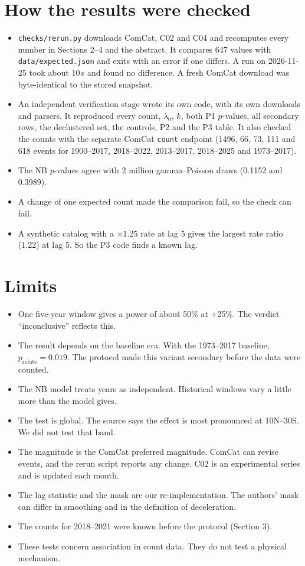 \documentclass[11pt]{article}
\begin{document}
\section{How the results were checked}
\begin{itemize}
\item \texttt{checks/rerun.py} downloads ComCat, C02 and C04 and recomputes every number in Sections 2--4 and the abstract. It compares 647 values with \texttt{data/expected.json} and exits with an error if one differs. A run on 2026-11-25 took about 10\,s and found no difference. A fresh ComCat download was byte-identical to the stored snapshot.
\item An independent verification stage wrote its own code, with its own downloads and parsers. It reproduced every count, $\lambda_0$, $k$, both P1 $p$-values, all secondary rows, the declustered set, the controls, P2 and the P3 table. It also checked the counts with the separate ComCat \texttt{count} endpoint (1496, 66, 73, 111 and 618 events for 1900--2017, 2018--2022, 2013--2017, 2018--2025 and 1973--2017).
\item The NB $p$-values agree with 2 million gamma--Poisson draws (0.1152 and 0.3989).
\item A change of one expected count made the comparison fail, so the check can fail.
\item A synthetic catalog with a $\times1.25$ rate at lag 5 gives the largest rate ratio (1.22) at lag 5. So the P3 code finds a known lag.
\end{itemize}

\section{Limits}
\begin{itemize}
\item One five-year window gives a power of about 50\% at +25\%. The verdict ``inconclusive'' reflects this.
\item The result depends on the baseline era. With the 1973--2017 baseline, $p_{\text{refute}} = 0.019$. The protocol made this variant secondary before the data were counted.
\item The NB model treats years as independent. Historical windows vary a little more than the model gives.
\item The test is global. The source says the effect is most pronounced at 10\textdegree N--30\textdegree S. We did not test that band.
\item The magnitude is the ComCat preferred magnitude. ComCat can revise events, and the rerun script reports any change. C02 is an experimental series and is updated each month.
\item The lag statistic and the mask are our re-implementation. The authors' mask can differ in smoothing and in the definition of deceleration.
\item The counts for 2018--2021 were known before the protocol (Section 3).
\item These tests concern association in count data. They do not test a physical mechanism.
\end{itemize}
\end{document}
